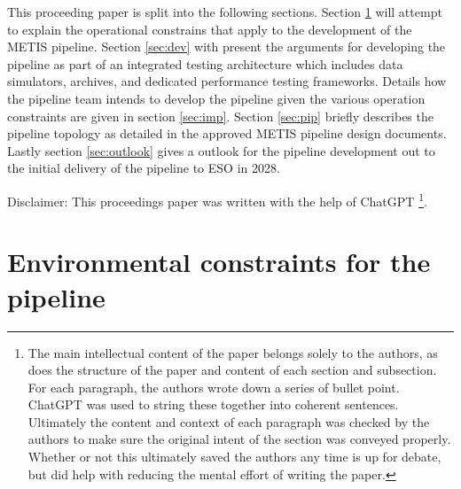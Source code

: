 \documentclass[a4paper]{spie}  %
\begin{document}
This proceeding paper is split into the following sections. Section \ref{sec:env} will attempt to explain the operational constrains that apply to the development of the METIS pipeline. Section \ref{sec:dev} with present the arguments for developing the pipeline as part of an integrated testing architecture which includes data simulators, archives, and dedicated performance testing frameworks. Details how the pipeline team intends to develop the pipeline given the various operation constraints are given in section \ref{sec:imp}. Section \ref{sec:pip} briefly describes the pipeline topology as detailed in the approved METIS pipeline design documents. Lastly section  \ref{sec:outlook} gives a outlook for the pipeline development out to the initial delivery of the pipeline to ESO in 2028.

Disclaimer: This proceedings paper was written with the help of ChatGPT \footnote{The main intellectual content of the paper belongs solely to the authors, as does the structure of the paper and content of each section and subsection. For each paragraph, the authors wrote down a series of bullet point. ChatGPT was used to string these together into coherent sentences. Ultimately the content and context of each paragraph was checked by the authors to make sure the original intent of the section was conveyed properly. Whether or not this ultimately saved the authors any time is up for debate, but did help with reducing the mental effort of writing the paper.}.

\section{Environmental constraints for the pipeline}
\label{sec:env}

\end{document}
